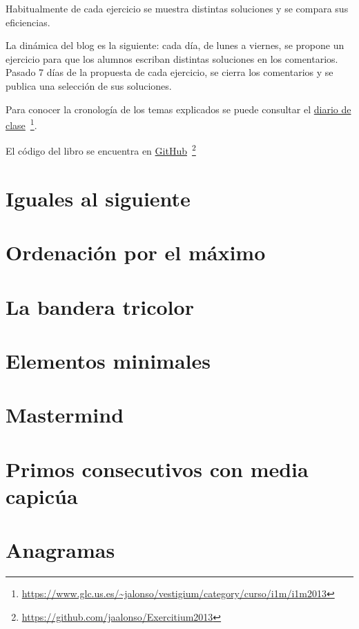 \documentclass[a4paper,12pt,twoside]{book}
\begin{document}
Habitualmente de cada ejercicio se muestra distintas soluciones y se
compara sus eficiencias.

La dinámica del blog es la siguiente: cada día, de lunes a viernes, se
propone un ejercicio para que los alumnos escriban distintas soluciones
en los comentarios. Pasado 7 días de la propuesta de cada ejercicio, se
cierra los comentarios y se publica una selección de sus soluciones.

Para conocer la cronología de los temas explicados se puede consultar el
\href{https://www.glc.us.es/~jalonso/vestigium/category/curso/i1m/i1m2013}
     {diario de clase}\
     \footnote{\url{https://www.glc.us.es/~jalonso/vestigium/category/curso/i1m/i1m2013}}.

El código del libro se encuentra en
\href{https://github.com/jaalonso/Exercitium2018}
     {GitHub}\
     \footnote{\url{https://github.com/jaalonso/Exercitium2013}}

\chapter{Iguales al siguiente}

\chapter{Ordenación por el máximo}

\chapter{La bandera tricolor}

\chapter{Elementos minimales}

\chapter{Mastermind}

\chapter{Primos consecutivos con media capicúa}

\chapter{Anagramas}
\end{document}
